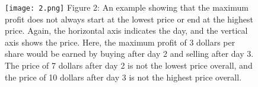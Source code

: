 \begin{figure}[H]
\texttt{[image: 2.png]}
\centering \linebreak \linebreak Figure 2: {\small An example showing that the maximum profit does not always start at the lowest price or end at the highest price. Again, the horizontal axis indicates the day, and the vertical axis shows the price. Here, the maximum profit of 3 dollars per share would be earned by buying after day 2 and selling after day 3. The price of 7 dollars after day 2 is not the lowest price overall, and the price of 10 dollars after day 3 is not the highest price overall.}
\end{figure} \hfill

\pagebreak